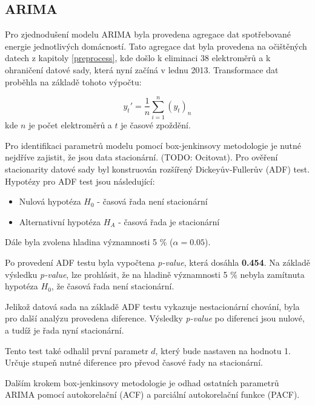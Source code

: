 \documentclass[FM,BP,fonts]{tulthesis}
\begin{document}
\subsection{ARIMA}

Pro zjednodušení modelu ARIMA byla provedena agregace dat spotřebované energie jednotlivých domácností. Tato agregace dat byla provedena na očištěných datech z kapitoly \ref{preprocess}, kde došlo k eliminaci 38 elektroměrů a k ohraničení datové sady, která nyní začíná v lednu 2013. Transformace dat proběhla na základě tohoto výpočtu:

\begin{equation}
	y_t' = \frac{1}{n}\sum_{i=1}^{n}(y_t)_n
\end{equation}
kde $n$ je počet elektroměrů a $t$ je časové zpoždění.

Pro identifikaci parametrů modelu pomocí box-jenkinsovy metodologie je nutné nejdříve zajistit, že jsou data stacionární. (TODO: Ocitovat). Pro ověření stacionarity datové sady byl konstruován rozšířený Dickeyův-Fullerův (ADF) test. Hypotézy pro ADF test jsou následující:
\begin{itemize}
\item Nulová hypotéza $H_0$ - časová řada není stacionární
\item Alternativní hypotéza $H_A$ - časová řada je stacionární
\end{itemize}
Dále byla zvolena hladina významnosti 5 \% ($\alpha=0.05$).

Po provedení ADF testu byla vypočtena \textit{p-value}, která dosáhla \textbf{0.454}. Na základě výsledku \textit{p-value}, lze prohlásit, že na hladině významnosti 5 \% nebyla zamítnuta hypotéza $H_0$, že časová řada není stacionární.

Jelikož datová sada na základě ADF testu vykazuje nestacionární chování, byla pro další analýzu provedena diference. Výsledky \textit{p-value} po diferenci jsou nulové, a tudíž je řada nyní stacionární.

Tento test také odhalil první parametr $d$, který bude nastaven na hodnotu 1. Určuje stupeň nutné diference pro převod časové řady na stacionární.

Dalším krokem box-jenkinsovy metodologie je odhad ostatních parametrů ARIMA pomocí autokorelační (ACF) a parciální autokorelační funkce (PACF).
\end{document}
